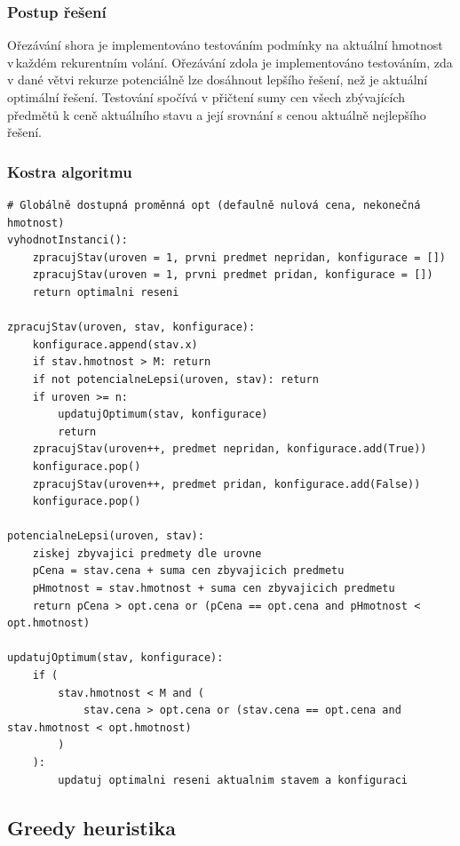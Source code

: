 \documentclass[12pt]{article}
\begin{document}
\subsubsection{Postup řešení}

Ořezávání shora je implementováno testováním podmínky na aktuální hmotnost v každém rekurentním volání. Ořezávání zdola je implementováno testováním, zda v dané větvi rekurze potenciálně lze dosáhnout lepšího řešení, než je aktuální optimální řešení. Testování spočívá v přičtení sumy cen všech zbývajících předmětů k ceně aktuálního stavu a její srovnání s cenou aktuálně nejlepšího řešení.

\subsubsection{Kostra algoritmu}
\begin{listing}[ht]
    \begin{verbatim}
# Globálně dostupná proměnná opt (defaulně nulová cena, nekonečná hmotnost)
vyhodnotInstanci():
    zpracujStav(uroven = 1, prvni predmet nepridan, konfigurace = [])
    zpracujStav(uroven = 1, prvni predmet pridan, konfigurace = []) 
    return optimalni reseni
 
zpracujStav(uroven, stav, konfigurace): 
    konfigurace.append(stav.x)
    if stav.hmotnost > M: return
    if not potencialneLepsi(uroven, stav): return
    if uroven >= n: 
        updatujOptimum(stav, konfigurace) 
        return 
    zpracujStav(uroven++, predmet nepridan, konfigurace.add(True))
    konfigurace.pop()
    zpracujStav(uroven++, predmet pridan, konfigurace.add(False))
    konfigurace.pop()

potencialneLepsi(uroven, stav):
    ziskej zbyvajici predmety dle urovne
    pCena = stav.cena + suma cen zbyvajicich predmetu
    pHmotnost = stav.hmotnost + suma cen zbyvajicich predmetu
    return pCena > opt.cena or (pCena == opt.cena and pHmotnost < opt.hmotnost)

updatujOptimum(stav, konfigurace): 
    if (
        stav.hmotnost < M and (
            stav.cena > opt.cena or (stav.cena == opt.cena and stav.hmotnost < opt.hmotnost)
        )
    ):
        updatuj optimalni reseni aktualnim stavem a konfiguraci
    \end{verbatim}
\end{listing}

\newpage

\subsection{Greedy heuristika}
\end{document}
